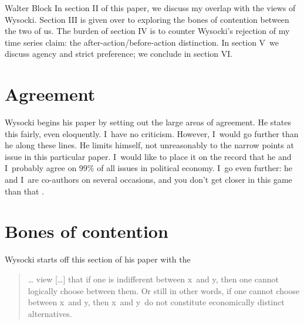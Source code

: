 \begin{artengenv}{Walter Block}
In section II of this paper, we discuss my overlap with the views of Wysocki. Section III is given over to exploring the bones of contention between the two of us. The burden of section IV is to counter Wysocki's rejection of my time series claim: the after-action/before-action distinction. In section V~we discuss agency and strict preference; we conclude in section VI.



\section{Agreement}

Wysocki begins his paper by setting out the large areas of agreement. He states this fairly, even eloquently. I~have no criticism. However, I~would go further than he along these lines. He limits himself, not unreasonably to the narrow points at issue in this particular paper. I~would like to place it on the record that he and I~probably agree on 99\% of all issues in political economy. I~go even further: he and I~are co-authors on several occasions, and you don't get closer in this game than that 
\parencites[][]{block_defense_2018}[][]{wysocki_note_2017}[][]{wysocki_analysis_2018}[][]{wysocki_homogeneity_2019}[][]{wysocki_crovelli_2020}[][]{wysocki_rejoinder_2022}[][]{wysocki_homogeneity_2019}.%




\section{Bones of contention}

Wysocki starts off this section of his paper with the



\begin{quote}
… view […] that if one is indifferent between x~and y, then one cannot logically choose between them. Or still in other words, if one cannot choose between x~and y, then x~and y~do not constitute economically distinct alternatives.
\end{quote}




\end{artengenv}
